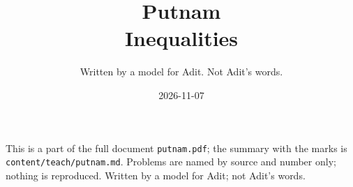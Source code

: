 
\title{Putnam\\[0.3em]\large Inequalities}
\author{Written by a model for Adit. Not Adit's words.}
\date{2026-11-07}

\maketitle
\noindent\small This is a part of the full document \texttt{putnam.pdf}; the summary with the marks is \texttt{content/teach/putnam.md}. Problems are named by source and number only; nothing is reproduced. Written by a model for Adit; not Adit's words.\normalsize



